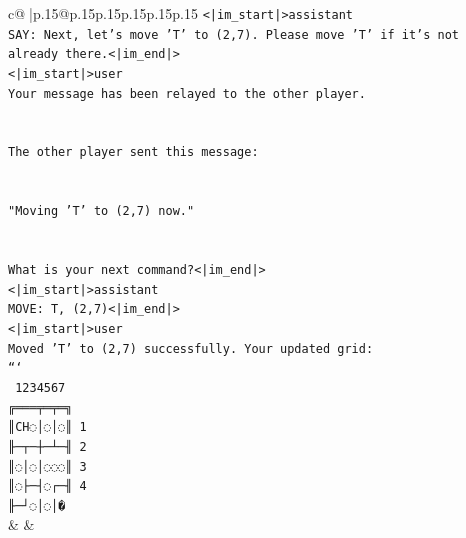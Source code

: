 \documentclass{article}
\begin{document}
{\begin{supertabular}{c@{$\;$}|p{.15\linewidth}@{}p{.15\linewidth}p{.15\linewidth}p{.15\linewidth}p{.15\linewidth}p{.15\linewidth}}
{{{\texttt{<|im\_start|>assistant} \\
\texttt{SAY: Next, let's move 'T' to (2,7). Please move 'T' if it's not already there.<|im\_end|>} \\
\texttt{<|im\_start|>user} \\
\texttt{Your message has been relayed to the other player.} \\
\\ 
\\ 
\texttt{The other player sent this message:} \\
\\ 
\\ 
\texttt{"Moving 'T' to (2,7) now."} \\
\\ 
\\ 
\texttt{What is your next command?<|im\_end|>} \\
\texttt{<|im\_start|>assistant} \\
\texttt{MOVE: T, (2,7)<|im\_end|>} \\
\texttt{<|im\_start|>user} \\
\texttt{Moved 'T' to (2,7) successfully. Your updated grid:} \\
\texttt{```} \\
\texttt{ 1234567} \\
\texttt{╔═══╤═╤═╗} \\
\texttt{║CH◌│◌│◌║ 1} \\
\texttt{╟─┬─┼─┴─╢ 2} \\
\texttt{║◌│◌│◌◌◌║ 3} \\
\texttt{║◌├─┤◌┌─╢ 4} \\
\texttt{╟─┘◌│◌│�} \\
            }
        }
    }
    & & \\ \\


\end{supertabular}}
\end{document}
